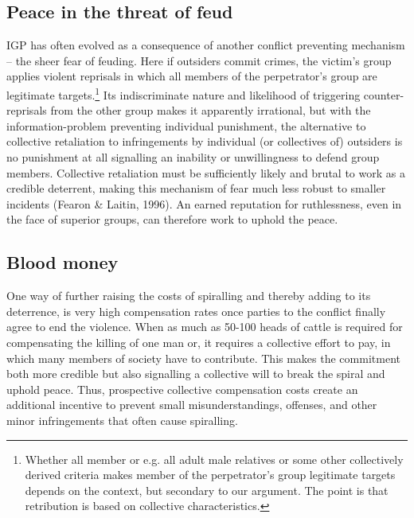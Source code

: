 \documentclass[12pt]{article}
\begin{document}
\subsection{Peace in the threat of feud}

IGP has often evolved as a consequence of another conflict preventing mechanism
– the sheer fear of feuding. Here if outsiders commit crimes, the victim’s group
applies violent reprisals in which all members of the perpetrator’s group are
legitimate targets.\footnote{ Whether all member or e.g. all adult male
	relatives or some other collectively derived criteria makes member of
	the perpetrator’s group legitimate targets depends on the context, but
secondary to our argument. The point is that retribution is based on collective
characteristics.} Its indiscriminate nature and likelihood of triggering
counter-reprisals from the other group makes it apparently irrational, but with
the information-problem preventing individual punishment, the alternative to
collective retaliation to infringements by individual (or collectives of)
outsiders is no punishment at all signalling an inability or unwillingness to
defend group members. Collective retaliation must be sufficiently likely and
brutal to work as a credible deterrent, making this mechanism of fear much less
robust to smaller incidents (Fearon \& Laitin, 1996). An earned reputation for
ruthlessness, even in the face of superior groups, can therefore work to uphold
the peace.


\subsection{Blood money}

One way of further raising the costs of spiralling and thereby adding to its
deterrence, is very high compensation rates once parties to the conflict finally
agree to end the violence. When as much as 50-100 heads of cattle is required
for compensating the killing of one man 
or, 
it requires a collective effort to pay, in which many members of society have to
contribute. This makes the commitment both more credible but also signalling a
collective will to break the spiral and uphold peace. Thus, prospective
collective compensation costs create an additional incentive to prevent small
misunderstandings, offenses, and other minor infringements that often cause
spiralling.
\end{document}

